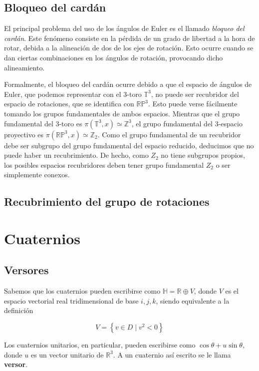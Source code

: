 \documentclass{article}
\theoremstyle{plain}
\theoremstyle{definition}
\theoremstyle{remark}
\begin{document}

\subsection{Bloqueo del cardán}

El principal problema del uso de los ángulos de Euler es el llamado \textit{bloqueo del cardán}. Este fenómeno
consiste en la pérdida de un grado de libertad a la hora de rotar, debida a la alineación de dos de los ejes
de rotación. Esto ocurre cuando se dan ciertas combinaciones en los ángulos de rotación, provocando dicho alineamiento.

Formalmente, el bloqueo del cardán ocurre debido a que el espacio de ángulos de Euler, que podemos representar con el 3-toro
$\mathbb T^3$, no puede ser recubridor del espacio de rotaciones, que se identifica con $\mathbb{RP}^3$. Esto puede verse
fácilmente tomando los grupos fundamentales de ambos espacios. Mientras que el grupo fundamental del 3-toro es
$\pi(\mathbb T^3, x) \simeq \mathbb Z^3$, el grupo fundamental del 3-espacio proyectivo es $\pi(\mathbb{RP}^3, x)
\simeq \mathbb Z_2$. Como el grupo fundamental de un recubridor debe ser subgrupo del grupo fundamental del espacio
reducido, deducimos que no puede haber un recubrimiento. De hecho, como $Z_2$ no tiene subgrupos propios, los posibles
espacios recubridores deben tener grupo fundamental $Z_2$ o ser simplemente conexos.

\subsection{Recubrimiento del grupo de rotaciones}


\section{Cuaternios}
\subsection{Versores}
Sabemos que los cuaternios pueden escribirse como
$\mathbb{H} = \mathbb{R} \oplus V$, donde $V$ es el espacio vectorial
real tridimensional de base $i,j,k$, siendo equivalente a la
definición

\[
  V = \left\{ v \in D \mid v^2 < 0 \right\}
\]

Los cuaternios unitarios, en particular, pueden escribirse como
$\cos \theta + u \sin \theta$, donde $u$ es un vector unitario de
$\mathbb{R}^3$. A un cuaternio así escrito se le llama
\textbf{versor}.
\end{document}
